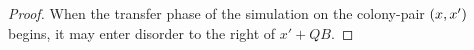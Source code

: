 \documentclass[11pt]{memoir}
\theoremstyle{definition} %
\renewcommand{\ge}{\geq}
\def\B{B}
\newcommand{\Q}{Q} %
\newcommand{\cns}[1]{c_{\textrm{\upshape #1}}}
\newcommand{\CSpill}{\cns{spill}}
\begin{document}
\begin{proof}
When the transfer phase of the simulation on the colony-pair \( (x,x') \) 
begins, it may enter disorder to the right of \( x'+\Q\B \).



  

\end{proof}
\end{document}
